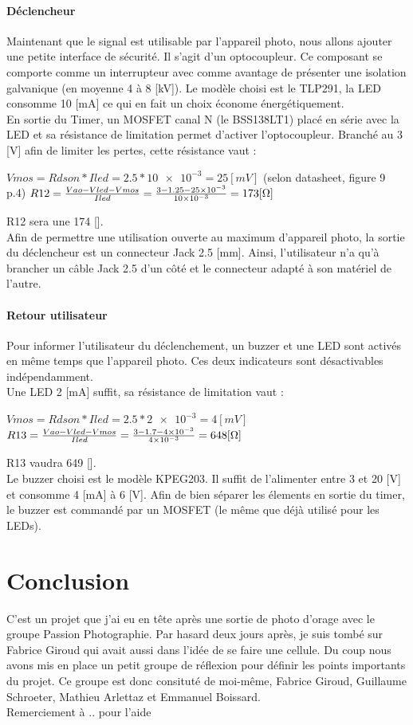 \documentclass[a4paper,10pt]{article}
\begin{document}
\paragraph{Déclencheur}
Maintenant que le signal est utilisable par l'appareil photo, nous allons ajouter une petite interface de sécurité. Il s'agit d'un optocoupleur. Ce composant se comporte comme un interrupteur avec comme avantage de présenter une isolation galvanique (en moyenne 4 à 8 [kV]). Le modèle choisi est le TLP291, la LED consomme 10 [mA] ce qui en fait un choix économe énergétiquement. \\
En sortie du Timer, un MOSFET canal N (le BSS138LT1) placé en série avec la LED et sa résistance de limitation permet d'activer l'optocoupleur. Branché au 3 [V] afin de limiter les pertes, cette résistance vaut :
\begin{center}
 $ Vmos = Rdson * Iled = 2.5*\num{10e-3} = 25 [mV] $ (selon datasheet, figure 9 p.4)
 $ R12 = \frac{Vao-Vled-Vmos}{Iled} = \frac{3-1.25-\num{25e-3}}{\num{10e-3}} = 173 [\ohm] $
\end{center}
R12 sera une 174 [\ohm].\\
Afin de permettre une utilisation ouverte au maximum d'appareil photo, la sortie du déclencheur est un connecteur Jack 2.5 [mm]. Ainsi, l'utilisateur n'a qu'à brancher un câble Jack 2.5 d'un côté et le connecteur adapté à son matériel de l'autre.

\paragraph{Retour utilisateur}
Pour informer l'utilisateur du déclenchement, un buzzer et une LED sont activés en même temps que l'appareil photo. Ces deux indicateurs sont désactivables indépendamment.\\
Une LED 2 [mA] suffit, sa résistance de limitation vaut :
\begin{center}
 $ Vmos = Rdson * Iled = 2.5*\num{2e-3} = 4 [mV] $
 $ R13 = \frac{Vao-Vled-Vmos}{Iled} = \frac{3-1.7-\num{4e-3}}{\num{4e-3}} = 648 [\ohm] $
\end{center}
R13 vaudra 649 [\ohm].\\
Le buzzer choisi est le modèle KPEG203. Il suffit de l'alimenter entre 3 et 20 [V] et consomme 4 [mA] à 6 [V]. Afin de bien séparer les élements en sortie du timer, le buzzer est commandé par un MOSFET (le même que déjà utilisé pour les LEDs).

 \pagebreak
 \section{Conclusion}
  C'est un projet que j'ai eu en tête après une sortie de photo d'orage avec le groupe Passion Photographie. Par hasard deux jours après, je suis tombé sur Fabrice Giroud qui avait aussi dans l'idée de se faire une cellule. Du coup nous avons mis en place un petit groupe de réflexion pour définir les points importants du projet. Ce groupe est donc consituté de moi-même, Fabrice Giroud, Guillaume Schroeter, Mathieu Arlettaz et Emmanuel Boissard.\\
 Remerciement à .. pour l'aide
 
\end{document}

